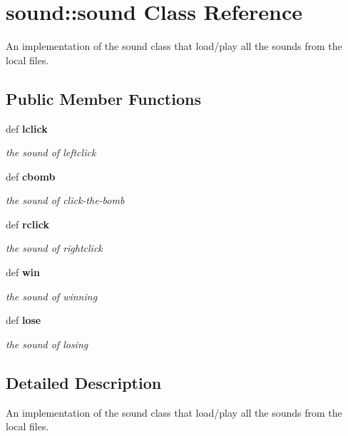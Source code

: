 \section{sound::sound Class Reference}
\label{classsound_1_1sound}
An implementation of the sound class that load/play all the sounds from the local files.  


\subsection*{Public Member Functions}
\begin{CompactItemize}
\item 
def \bf{lclick}
\begin{CompactList}\small\item\em the sound of leftclick \item\end{CompactList}\item 
def \bf{cbomb}
\begin{CompactList}\small\item\em the sound of click-the-bomb \item\end{CompactList}\item 
def \bf{rclick}
\begin{CompactList}\small\item\em the sound of rightclick \item\end{CompactList}\item 
def \bf{win}
\begin{CompactList}\small\item\em the sound of winning \item\end{CompactList}\item 
def \bf{lose}
\begin{CompactList}\small\item\em the sound of losing \item\end{CompactList}\end{CompactItemize}


\subsection{Detailed Description}
An implementation of the sound class that load/play all the sounds from the local files. 



